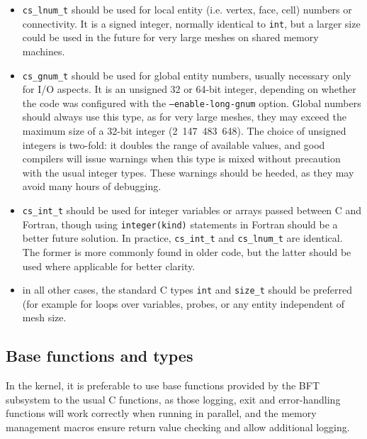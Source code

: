 \begin{itemize}
\item \texttt{cs\_lnum\_t} should be used for local entity (i.e. vertex, face,
      cell) numbers or connectivity. It is a signed integer, normally identical
      to \texttt{int}, but a larger size could be used in the future for very
      large meshes on shared memory machines.

\item \texttt{cs\_gnum\_t} should be used for global entity numbers, usually
      necessary only for I/O aspects. It is an unsigned 32 or 64-bit integer,
      depending on whether the code was configured with the
      \texttt{--enable-long-gnum} option. Global numbers should always use
      this type, as for very large meshes, they may exceed the maximum size
      of a 32-bit integer (2~147~483~648). The choice of unsigned integers
      is two-fold: it doubles the range of available values, and good compilers
      will issue warnings when this type is mixed without precaution with
      the usual integer types. These warnings should be heeded, as they may
      avoid many hours of debugging.

\item \texttt{cs\_int\_t} should be used for integer variables or arrays passed
      between C and Fortran, though using \texttt{integer(kind)} statements
      in Fortran should be a better future solution. In practice,
      \texttt{cs\_int\_t} and \texttt{cs\_lnum\_t} are identical. The former
      is more commonly found in older code, but the latter should be used where
      applicable for better clarity.

\item in all other cases, the standard C types \texttt{int} and \texttt{size\_t}
      should be preferred (for example for loops over variables, probes, or
      any entity independent of mesh size.
\end{itemize}

\subsection{Base functions and types}

In the \CS kernel, it is preferable to use base functions provided by the
BFT subsystem to the usual C functions, as those logging, exit and error-handling
functions will work correctly when running in parallel, and the memory
management macros ensure return value checking and allow additional logging.

